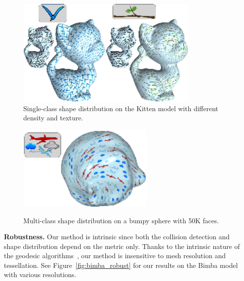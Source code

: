  \begin{figure}[htb]
  \centering
  \includegraphics[width=0.8\textwidth]{figs/asd/kitten_singleclass_density.png}
  \caption{Single-class shape distribution on the Kitten model with different density and texture. }
  \label{fig:kitten_density}
  \end{figure}

  \begin{figure}[htb]
  \centering
  \includegraphics[width=0.6\textwidth]{figs/asd/multiclass_aotu.png}\\
  \caption{Multi-class shape distribution on a bumpy sphere with 50K faces.}
  \label{fig:multiclass}
  \end{figure}

  \noindent\textbf{Robustness.} Our method is intrinsic since both the collision detection and shape distribution depend on the metric only.
  Thanks to the intrinsic nature of the geodesic algorithms~\cite{Ying13SVG,xin2012constant},
  our method is insensitive to mesh resolution and tessellation.
  See Figure~\ref{fig:bimba_robust} for our results on the Bimba model with various resolutions.


